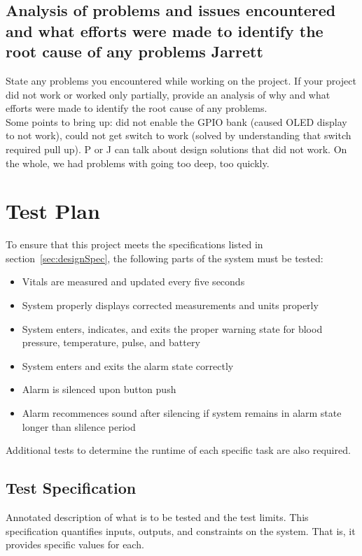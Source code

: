 \documentclass[12pt]{article} %
\begin{document}
\subsection{Analysis of problems and issues encountered and what efforts were made to identify the root cause of any problems  Jarrett}

State any problems you encountered while working on the project. If your project did not work or worked only partially, provide an analysis of why and what efforts were made to identify the root cause of any problems. \\

Some points to bring up: did not enable the GPIO bank (caused OLED display to not work), could not get switch to work (solved by understanding that switch required pull up). P or J can talk about design solutions that did not work. On the whole, we had problems with going too deep, too quickly.

\section{Test Plan}

To ensure that this project meets the specifications listed in 
section~\ref{sec:designSpec}, the following parts of the system must be 
tested: 

\begin{itemize}
	\item Vitals are measured and updated every five seconds
	\item System properly displays corrected measurements and units properly
	\item System enters, indicates, and exits the proper warning state for blood pressure, temperature, pulse, and battery
	\item System enters and exits the alarm state correctly
	\item Alarm is silenced upon button push
	\item Alarm recommences sound after silencing if system remains in alarm state longer than slilence period
\end{itemize}

Additional tests to determine the runtime of each specific task are also required.

\subsection{Test Specification}

Annotated description of what is to be tested and the test limits.  This specification quantifies inputs, outputs, and constraints on the system.  That is, it provides specific values for each. 
\end{document}
